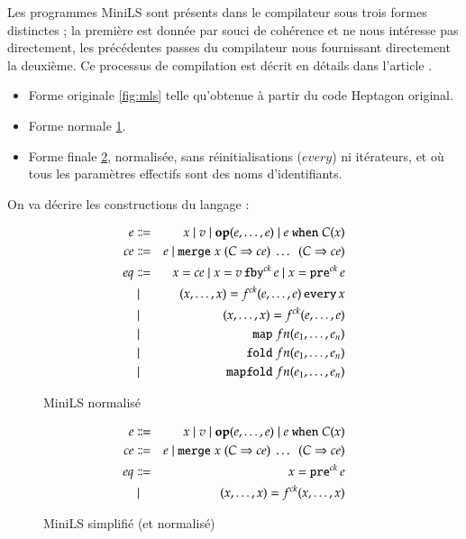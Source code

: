 \documentclass[9pt,a4paper]{article}
\newcommand{\LANG}{Heptagon}
\newcommand{\p}[0]{\; \vert \;}
\newcommand{\mybox}[1]{\mbox{\tt{#1}}}
\newcommand{\Op}[2]{\mybox{\bf{op}}(#1,\dots,#2)}
\newcommand{\Fby}[2]{#1 \, \mybox{fby}^{ck} \, #2}
\newcommand{\Pre}[1]{\mybox{pre}^{ck} \, #1}
\newcommand{\Every}[4]{#1^{ck}(#2,\dots,#3) \, \mybox{every} \, #4}
\newcommand{\App}[2]{#1^{ck}(#2)}
\newcommand{\When}[3]{#1 \; \mybox{when} \; #2(#3)}
\newcommand{\Merge}[5]{\mybox{merge} \; #1 \; (#2 \Rightarrow #3) \; \dots \; \
  (#4 \Rightarrow #5)}
\newcommand{\Map}[3]{\mathtt{map} \; #1 n (#2,\dots,#3)}
\newcommand{\Fold}[3]{\mathtt{fold} \; #1 n (#2,\dots,#3)}
\newcommand{\Mapfold}[3]{\mathtt{mapfold} \; #1 n (#2,\dots,#3)}
\begin{document}
Les programmes MiniLS sont présents dans le compilateur sous trois formes
distinctes ; la première est donnée par souci de cohérence et ne nous intéresse
pas directement, les précédentes passes du compilateur nous fournissant
directement la deuxième. Ce processus de compilation est décrit en détails dans
l'article \cite{lctes08a}.

\begin{itemize}
\item Forme originale \ref{fig:mls} telle qu'obtenue à partir du code \LANG{}
  original.
\item Forme normale \ref{fig:mlsn}.
\item Forme finale \ref{fig:mlsns}, normalisée, sans réinitialisations ($every$)
  ni itérateurs, et où tous les paramètres effectifs sont des noms
  d'identifiants.
\end{itemize}

On va décrire les constructions du langage :

\begin{figure}[htp]
  \centering
  \begin{eqnarray*}
    e & \Coloneqq & x \p v \p \Op{e}{e} \p \When{e}{C}{x} \\
    ce & \Coloneqq & e \p \Merge{x}{C}{ce}{C}{ce} \\
    eq & \Coloneqq & x = ce \p x = \Fby{v}{e} \p x = \Pre{e} \\
    & \p & (x,\dots,x) = \Every{f}{e}{e}{x} \\
    & \p & (x,\dots,x) = \App{f}{e,\dots,e} \\
    & \p & \Map{f}{e_1}{e_n} \\
    & \p & \Fold{f}{e_1}{e_n} \\
    & \p & \Mapfold{f}{e_1}{e_n}
  \end{eqnarray*}
  \caption{MiniLS normalisé}
  \label{fig:mlsn}
\end{figure}

\begin{figure}[htp]
  \centering
  \begin{eqnarray*}
    e & \Coloneqq & x \p v \p \Op{e}{e} \p \When{e}{C}{x} \\
    ce & \Coloneqq & e \p \Merge{x}{C}{ce}{C}{ce} \\
    eq & \Coloneqq & x = \Pre{e} \\
    & \p & (x,\dots,x) = \App{f}{x,\dots,x}
  \end{eqnarray*}
  \caption{MiniLS simplifié (et normalisé)}
  \label{fig:mlsns}
\end{figure}
\end{document}
